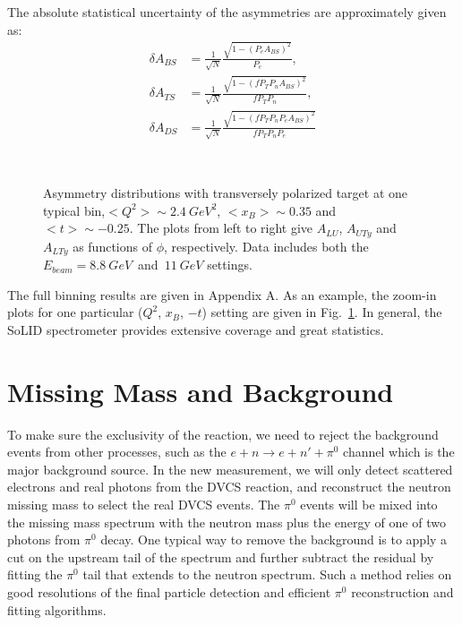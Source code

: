 The absolute statistical uncertainty of the asymmetries are approximately given as:
\begin{align}
 \delta A_{BS} &=  \frac{1}{\sqrt{N}}\frac{\sqrt{1- (P_{e}A_{BS})^{2}}}{P_{e}}, \\
 \delta A_{TS} &=  \frac{1}{\sqrt{N}}\frac{\sqrt{1- (fP_{T} P_{n}A_{BS})^{2}}}{f P_{T} P_{n}}, \\
 \delta A_{DS} &=  \frac{1}{\sqrt{N}}\frac{\sqrt{1- (fP_{T} P_{n}P_{e}A_{BS})^{2}}}{ fP_{T} P_{n}P_{e}}
\end{align}

\begin{figure}[!ht]
 \begin{center}
    \\
\caption[Asymmetry distributions with transversely polarized target at one typical bin,$<Q^{2}>\sim 2.4~GeV^{2}$, $<x_{B}>\sim 0.35$ and $<t>\sim -0.25$]{\footnotesize{Asymmetry distributions with transversely polarized target at one typical bin,$<Q^{2}>\sim 2.4~GeV^{2}$, $<x_{B}>\sim 0.35$ and $<t>\sim -0.25$. The plots from left to right give $A_{LU}$, $A_{UTy}$ and $A_{LTy}$ as functions of $\phi$, respectively. Data includes both the $E_{beam}=8.8~GeV$~and~$11~GeV$ settings.}}
  \label{b11_Q2_3_tx}
  \end{center}
\end{figure}
The full binning results are given in Appendix A. As an example, the zoom-in plots for one particular ($Q^{2}$, $x_{B}$, $-t$) setting are given in Fig.~\ref{b11_Q2_3_tx}. In general, the SoLID spectrometer provides extensive coverage and great statistics. %

\section {Missing Mass and Background}
 To make sure the exclusivity of the reaction, we need to reject the background events from other processes, such as the $e+n\rightarrow e+n'+\pi^{0}$ channel which is the major background source. In the new measurement, we will only detect scattered electrons and real photons from the DVCS reaction, and reconstruct the neutron missing mass to select the real DVCS events. The $\pi^{0}$ events will be mixed into the missing mass spectrum with the neutron mass plus the energy of one of two photons from $\pi^{0}$ decay. One typical way to remove the background is to apply a cut on the upstream tail of the spectrum and further subtract the residual by fitting the  $\pi^{0}$ tail that extends to the neutron spectrum. Such a method relies on good resolutions of the final particle detection and efficient $\pi^{0}$ reconstruction and fitting algorithms.
 
